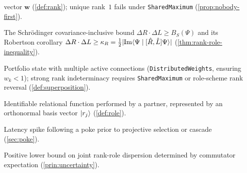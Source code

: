\begin{description}[leftmargin=1.8em,style=nextline]
        vector $\mathbf{w}$ (\cref{def:rank}); unique rank~$1$ fails under
        \textnormal{\texttt{SharedMaximum}} (\cref{prop:nobody-first}).
  \item[Rank-Role Inequality] The Schr\"odinger covariance-inclusive bound
        $\Delta R \cdot \Delta L \ge B_S(\Psi)$ and its Robertson corollary
        $\Delta R \cdot \Delta L \ge \kappa_R = \frac{1}{2}\lvert \operatorname{Im}\langle \Psi \mid [\hat{R}, \hat{L}]\Psi \rangle \rvert$
        (\cref{thm:rank-role-inequality}).
  \item[Relational superposition] Portfolio state with multiple active connections
        (\textnormal{\texttt{DistributedWeights}}, ensuring $w_k < 1$); strong rank
        indeterminacy requires \textnormal{\texttt{SharedMaximum}} or role-scheme rank
        reversal (\cref{def:superposition}).
  \item[Role] Identifiable relational function performed by a partner, represented
        by an orthonormal basis vector $\lvert r_j \rangle$ (\cref{def:role}).
  \item[Silence phase] Latency spike following a poke prior to projective
        selection or cascade (\cref{sec:poke}).
  \item[Situationship constant ($\kappaS$)] Positive lower bound on joint
        rank-role dispersion determined by commutator expectation (\cref{prin:uncertainty}).
\end{description}
